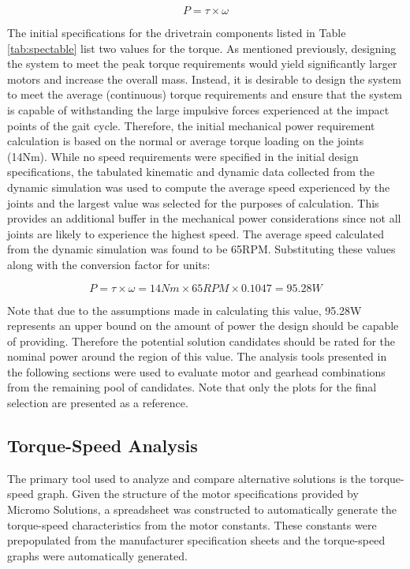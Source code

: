 \begin{equation}
	P = \tau \times \omega
\end{equation}

The initial specifications for the drivetrain components listed in Table \ref{tab:spectable} list two values for the torque. As mentioned previously, designing the system to meet the peak torque requirements would yield significantly larger motors and increase the overall mass. Instead, it is desirable to design the system to meet the average (continuous) torque requirements and ensure that the system is capable of withstanding the large impulsive forces experienced at the impact points of the gait cycle. Therefore, the initial mechanical power requirement calculation is based on the normal or average torque loading on the joints (14Nm). While no speed requirements were specified in the initial design specifications, the tabulated kinematic and dynamic data collected from the dynamic simulation was used to compute the average speed experienced by the joints and the largest value was selected for the purposes of calculation. This provides an additional buffer in the mechanical power considerations since not all joints are likely to experience the highest speed. The average speed calculated from the dynamic simulation was found to be 65RPM. Substituting these values along with the conversion factor for units: 

\begin{equation}
	P = \tau \times \omega = 14Nm \times 65RPM \times 0.1047 = 95.28W
\end{equation}

Note that due to the assumptions made in calculating this value, 95.28W represents an upper bound on the amount of power the design should be capable of providing. Therefore the potential solution candidates should be rated for the nominal power around the region of this value. The analysis tools presented in the following sections were used to evaluate motor and gearhead combinations from the remaining pool of candidates. Note that only the plots for the final selection are presented as a reference.

\subsection{Torque-Speed Analysis} %
\label{sub:torque_speed_analysis}
The primary tool used to analyze and compare alternative solutions is the torque-speed graph. Given the structure of the motor specifications provided by Micromo Solutions, a spreadsheet was constructed to automatically generate the torque-speed characteristics from the motor constants. These constants were prepopulated from the manufacturer specification sheets and the torque-speed graphs were automatically generated. 


